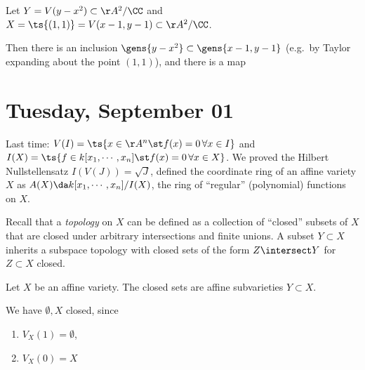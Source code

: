 \begin{example}

Let \(Y = V(y-x^2) \subset \AA^2/\CC\) and
\(X = \ts{(1, 1)} = V(x-1, y-1)\subset \AA^2/\CC\).

Then there is an inclusion \(\gens{y-x^2} \subset \gens{x-1, y-1}\)
(e.g.~by Taylor expanding about the point \((1, 1)\)), and there is a
map

\begin{center}\end{center}

\end{example}

\hypertarget{tuesday-september-01}{%
\section{Tuesday, September 01}\label{tuesday-september-01}}

Last time: \(V(I) = \ts{x\in \AA^n \st f(x) = 0 \, \forall x\in I}\) and
\(I(X) = \ts{f\in k[x_1, \cdots, x_n] \st f(x) = 0\, \forall x\in X}\).
We proved the Hilbert Nullstellensatz \(I(V(J)) = \sqrt{J}\), defined
the coordinate ring of an affine variety \(X\) as
\(A(X) \da k[x_1, \cdots, x_n] / I(X)\), the ring of ``regular''
(polynomial) functions on \(X\).

Recall that a \emph{topology} on \(X\) can be defined as a collection of
``closed'' subsets of \(X\) that are closed under arbitrary
intersections and finite unions. A subset \(Y\subset X\) inherits a
subspace topology with closed sets of the form \(Z\intersect Y\) for
\(Z\subset X\) closed.

\begin{definition}

Let \(X\) be an affine variety. The closed sets are affine subvarieties
\(Y\subset X\).

\end{definition}

We have \(\emptyset, X\) closed, since

\begin{enumerate}
\def\labelenumi{\arabic{enumi}.}
\tightlist
\item
  \(V_X(1) = \emptyset\),
\item
  \(V_X(0) = X\)
\end{enumerate}


